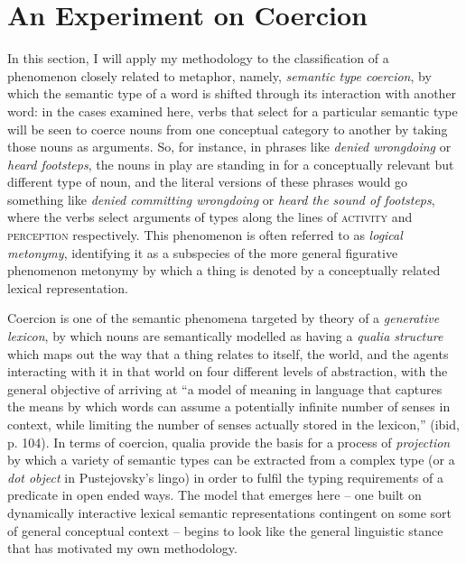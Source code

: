 \section{An Experiment on Coercion}
In this section, I will apply my methodology to the classification of a phenomenon closely related to metaphor, namely, \emph{semantic type coercion}, by which the semantic type of a word is shifted through its interaction with another word: in the cases examined here, verbs that select for a particular semantic type will be seen to coerce nouns from one conceptual category to another by taking those nouns as arguments.  So, for instance, in phrases like \emph{denied wrongdoing} or \emph{heard footsteps}, the nouns in play are standing in for a conceptually relevant but different type of noun, and the literal versions of these phrases would go something like \emph{denied committing wrongdoing} or \emph{heard the sound of footsteps}, where the verbs select arguments of types along the lines of \textsc{activity} and \textsc{perception} respectively.  This phenomenon is often referred to as \emph{logical metonymy}, identifying it as a subspecies of the more general figurative phenomenon metonymy by which a thing is denoted by a conceptually related lexical representation.

Coercion is one of the semantic phenomena targeted by  theory of a \emph{generative lexicon}, by which nouns are semantically modelled as having a \emph{qualia structure} which maps out the way that a thing relates to itself, the world, and the agents interacting with it in that world on four different levels of abstraction, with the general objective of arriving at ``a model of meaning in language that captures the means by which words can assume a potentially infinite number of senses in context, while limiting the number of senses actually stored in the lexicon,'' (ibid, p. 104).  In terms of coercion, qualia provide the basis for a process of \emph{projection} by which a variety of semantic types can be extracted from a complex type (or a \emph{dot object} in Pustejovsky's lingo) in order to fulfil the typing requirements of a predicate in open ended ways.  The model that emerges here -- one built on dynamically interactive lexical semantic representations contingent on some sort of general conceptual context -- begins to look like the general linguistic stance that has motivated my own methodology.

